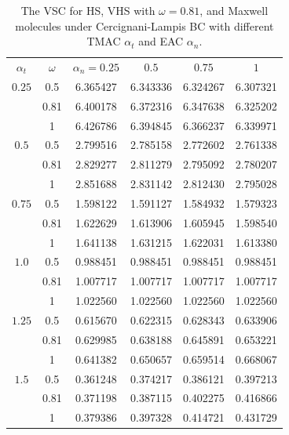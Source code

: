 \begin{table}[t]
	\caption{ The VSC for HS, VHS with $\omega=0.81$, and Maxwell molecules under Cercignani-Lampis BC with different TMAC $\alpha_t$ and EAC $\alpha_n$.}
	\label{table_CL_0}
	\centering
	
	\begin{tabular}{cccccc}
		\hline
		$\alpha_t$	& $\omega$
		&  $\alpha_n=0.25$ & $ 0.5$  &    $0.75$ &    $ 1$\\
		$0.25$
		& 0.5	& 6.365427  & 6.343336   & 6.324267 &  6.307321  \\
		&0.81	& 6.400178  & 6.372316   & 6.347638 &  6.325202  \\
		&1	    & 6.426786  & 6.394845   & 6.366237 &  6.339971  \\
		$0.5$
		& 0.5	& 2.799516   & 2.785158   & 2.772602 & 2.761338  \\
		&0.81	& 2.829277   & 2.811279   & 2.795092 & 2.780207  \\
		&1		& 2.851688   & 2.831142   & 2.812430 &  2.795028  \\
		
		$0.75$
		& 0.5	& 1.598122   & 1.591127   & 1.584932  & 1.579323 \\
		&0.81	& 1.622629   & 1.613906   & 1.605945  & 1.598540 \\
		&1		& 1.641138   & 1.631215   & 1.622031 &  1.613380  \\
		$1.0$
		& 0.5	& 0.988451   & 0.988451   & 0.988451 & 0.988451 \\
		&0.81	& 1.007717   & 1.007717   & 1.007717 & 1.007717 \\
		&1		& 1.022560   & 1.022560   & 1.022560 &  1.022560  \\
		
		$1.25$
		& 0.5	& 0.615670   & 0.622315   & 0.628343 &  0.633906 \\
		&0.81	& 0.629985   & 0.638188   & 0.645891  & 0.653221 \\
		&1		& 0.641382   & 0.650657   & 0.659514 &  0.668067  \\
		
		$1.5$
		& 0.5	& 0.361248   & 0.374217   & 0.386121 & 0.397213 \\
		&0.81	& 0.371198   & 0.387115   & 0.402275 &0.416866 \\
		&1		& 0.379386   & 0.397328   & 0.414721 & 0.431729  \\
		

\end{tabular}
\end{table}
